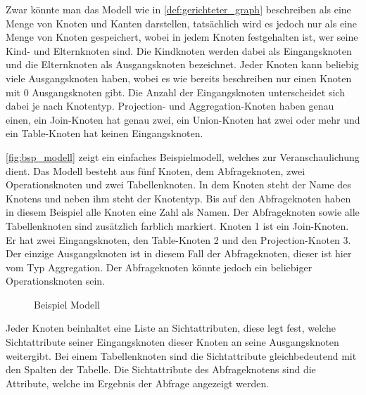 Zwar könnte man das Modell wie in \autoref{def:gerichteter_graph} beschreiben
als eine Menge von Knoten und Kanten darstellen, tatsächlich wird es jedoch nur
als eine Menge von Knoten gespeichert, wobei in jedem Knoten festgehalten ist,
wer seine Kind- und Elternknoten sind. Die Kindknoten werden dabei als
Eingangsknoten und die Elternknoten als Ausgangsknoten bezeichnet.
Jeder Knoten kann beliebig viele Ausgangsknoten haben, wobei es wie
bereits beschreiben nur einen Knoten mit $0$ Ausgangsknoten gibt.
Die Anzahl der Eingangsknoten unterscheidet sich dabei je nach Knotentyp.
\foreignlanguage{english}{Projection}- und
\foreignlanguage{english}{Aggregation}-Knoten haben genau einen, ein
\foreignlanguage{english}{Join}-Knoten hat genau zwei, ein
\foreignlanguage{english}{Union}-Knoten hat zwei oder mehr und ein
\foreignlanguage{english}{Table}-Knoten hat keinen Eingangsknoten.

\autoref{fig:bsp_modell} zeigt ein einfaches Beispielmodell, welches zur
Veranschaulichung dient. Das Modell besteht aus fünf Knoten, dem Abfrageknoten,
zwei Operationsknoten und zwei Tabellenknoten. In dem Knoten steht der Name des
Knotens und neben ihm steht der Knotentyp. Bis auf den Abfrageknoten haben in
diesem Beispiel alle Knoten eine Zahl als Namen. Der Abfrageknoten sowie alle
Tabellenknoten sind zusätzlich farblich markiert. Knoten 1 ist ein
\foreignlanguage{english}{Join}-Knoten. Er hat zwei Eingangsknoten,
den \foreignlanguage{english}{Table}-Knoten 2 und den
\foreignlanguage{english}{Projection}-Knoten 3. Der einzige Ausgangsknoten ist in diesem Fall der
Abfrageknoten, dieser ist hier vom Typ \foreignlanguage{english}{Aggregation}.
Der Abfrageknoten könnte jedoch ein beliebiger Operationsknoten sein.

\begin{figure}
    \begin{center}
        
    \end{center}
    \caption{Beispiel Modell}\label{fig:bsp_modell}
\end{figure}

Jeder Knoten beinhaltet eine Liste an Sichtattributen, diese legt fest, welche
Sichtattribute seiner Eingangsknoten dieser Knoten an seine Ausgangsknoten
weitergibt. Bei einem Tabellenknoten sind die Sichtattribute gleichbedeutend
mit den Spalten der Tabelle. Die Sichtattribute des Abfrageknotens sind die
Attribute, welche im Ergebnis der Abfrage angezeigt werden.

